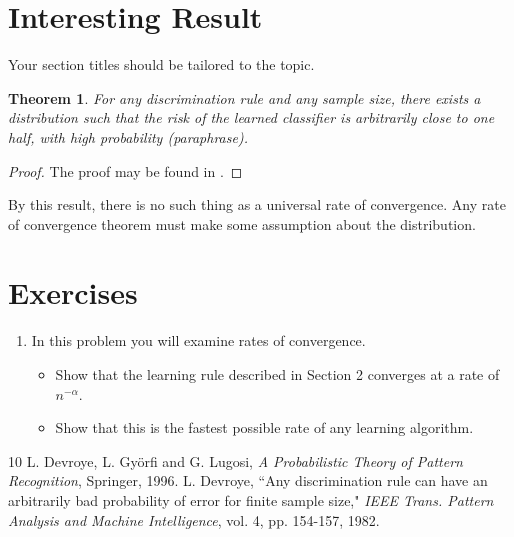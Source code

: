 \documentclass{article}
\theoremstyle{plain}
\newtheorem{thm}{Theorem}[section]
\theoremstyle{definition}
\begin{document}
\section{Interesting Result}

Your section titles should be tailored to the topic.

\begin{thm}
For any discrimination rule and any sample size, there exists a
distribution such that the risk of the learned classifier is arbitrarily
close to one half, with high probability (paraphrase).
\end{thm}
\begin{proof}
The proof may be found in \cite{devroye96,devroye82}.
\end{proof}
By this result, there is no such thing as a universal rate of
convergence. Any rate of convergence theorem must make some assumption
about the distribution.

\section*{Exercises} %

\begin{enumerate}
\item In this problem you will examine rates
of convergence.
\begin{itemize}
\item[(a)] Show that the learning rule described in Section 2 converges at
a rate of $n^{-\alpha}$.
\item[(b)] Show that this is the fastest possible rate of any learning
algorithm.
\end{itemize}
\end{enumerate}


\begin{thebibliography}{10}
L. Devroye, L. Gy{\"o}rfi and G. Lugosi,
{\it A Probabilistic Theory of Pattern Recognition}, Springer, 1996.
L. Devroye, ``Any discrimination rule can have an arbitrarily bad
probability of error for finite sample size," {\it IEEE Trans. Pattern
Analysis and Machine Intelligence}, vol. 4, pp. 154-157, 1982.
\end{thebibliography}
\end{document}
